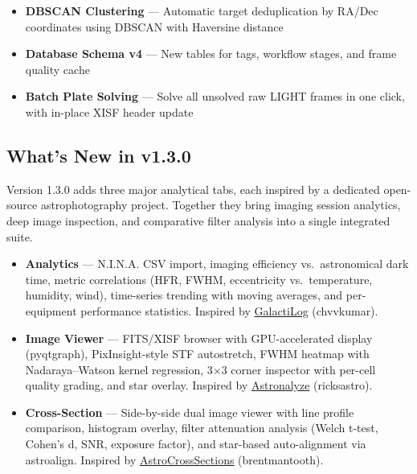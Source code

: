 \documentclass[11pt,a4paper]{article}
\begin{document}
\begin{newfeaturebox}
\begin{itemize}
    \item \textbf{DBSCAN Clustering} --- Automatic target deduplication by RA/Dec coordinates using DBSCAN with Haversine distance
    \item \textbf{Database Schema v4} --- New tables for tags, workflow stages, and frame quality cache
    \item \textbf{Batch Plate Solving} --- Solve all unsolved raw LIGHT frames in one click, with in-place XISF header update
\end{itemize}
\end{newfeaturebox}

\subsection{What's New in v1.3.0}

Version 1.3.0 adds three major analytical tabs, each inspired by a dedicated open-source astrophotography project. Together they bring imaging session analytics, deep image inspection, and comparative filter analysis into a single integrated suite.

\begin{newfeaturebox}
\begin{itemize}
    \item \textbf{Analytics} --- N.I.N.A. CSV import, imaging efficiency vs.\ astronomical dark time, metric correlations (HFR, FWHM, eccentricity vs.\ temperature, humidity, wind), time-series trending with moving averages, and per-equipment performance statistics. Inspired by \href{https://github.com/chvvkumar/GalactiLog}{GalactiLog} (chvvkumar).
    \item \textbf{Image Viewer} --- FITS/XISF browser with GPU-accelerated display (pyqtgraph), PixInsight-style STF autostretch, FWHM heatmap with Nadaraya--Watson kernel regression, 3$\times$3 corner inspector with per-cell quality grading, and star overlay. Inspired by \href{https://github.com/ricksastro/Astronalyze}{Astronalyze} (ricksastro).
    \item \textbf{Cross-Section} --- Side-by-side dual image viewer with line profile comparison, histogram overlay, filter attenuation analysis (Welch t-test, Cohen's d, SNR, exposure factor), and star-based auto-alignment via astroalign. Inspired by \href{https://github.com/brentmantooth/AstroCrossSections}{AstroCrossSections} (brentmantooth).
\end{itemize}
\end{newfeaturebox}
\end{document}
